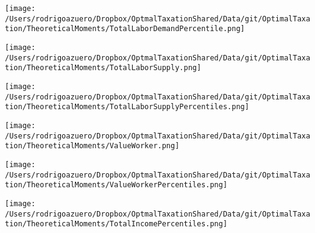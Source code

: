 \documentclass[12pt]{article}
\begin{document}
\texttt{[image: /Users/rodrigoazuero/Dropbox/OptmalTaxationShared/Data/git/OptimalTaxation/TheoreticalMoments/TotalLaborDemandPercentile.png]}

\texttt{[image: /Users/rodrigoazuero/Dropbox/OptmalTaxationShared/Data/git/OptimalTaxation/TheoreticalMoments/TotalLaborSupply.png]}

\texttt{[image: /Users/rodrigoazuero/Dropbox/OptmalTaxationShared/Data/git/OptimalTaxation/TheoreticalMoments/TotalLaborSupplyPercentiles.png]}

\texttt{[image: /Users/rodrigoazuero/Dropbox/OptmalTaxationShared/Data/git/OptimalTaxation/TheoreticalMoments/ValueWorker.png]}

\texttt{[image: /Users/rodrigoazuero/Dropbox/OptmalTaxationShared/Data/git/OptimalTaxation/TheoreticalMoments/ValueWorkerPercentiles.png]}

\texttt{[image: /Users/rodrigoazuero/Dropbox/OptmalTaxationShared/Data/git/OptimalTaxation/TheoreticalMoments/TotalIncomePercentiles.png]}
\end{document}
